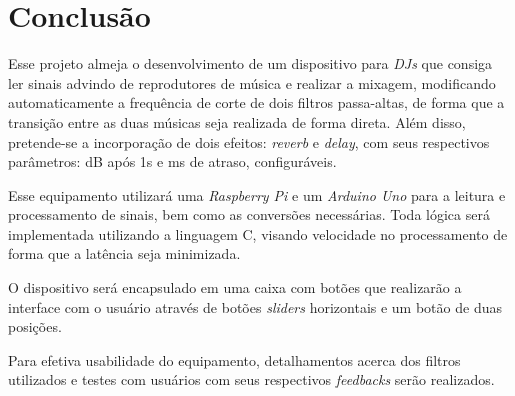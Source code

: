 \chapter[Conclusão]{Conclusão}


Esse projeto almeja o desenvolvimento de um dispositivo para \textit{DJs} que consiga ler sinais advindo de reprodutores de música e realizar a mixagem, modificando automaticamente a frequência de corte de dois filtros passa-altas, de forma que a transição entre as duas músicas seja realizada de forma direta. Além disso, pretende-se a incorporação de dois efeitos: \textit{reverb} e \textit{delay}, com seus respectivos parâmetros: dB após 1s e ms de atraso, configuráveis. 

Esse equipamento utilizará uma \textit{Raspberry Pi} e um \textit{Arduino Uno} para a leitura e processamento de sinais, bem como as conversões necessárias. Toda lógica será implementada utilizando a linguagem C, visando velocidade no processamento de forma que a latência seja minimizada.

O dispositivo será encapsulado em uma caixa com botões que realizarão a interface com o usuário através de botões \textit{sliders} horizontais e um botão de duas posições.

Para efetiva usabilidade do equipamento, detalhamentos acerca dos filtros utilizados e testes com usuários com seus respectivos \textit{feedbacks} serão realizados.
